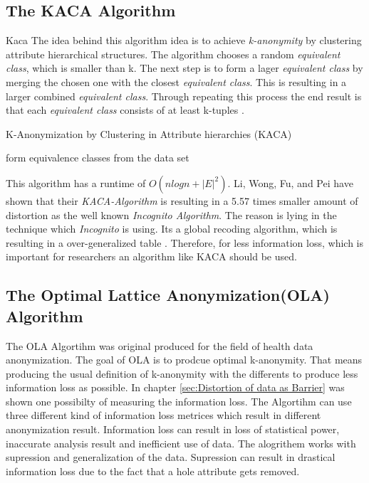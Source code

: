 \documentclass{llncs}
\begin{document}
\subsection{The KACA Algorithm}{Kaca}
The idea behind this algorithm idea is to achieve \textit{k-anonymity} by clustering attribute hierarchical structures. The algorithm chooses a random \textit{equivalent class}, which is smaller than k. The next step is to form a lager \textit{equivalent class} by merging the chosen one with the closest \textit{equivalent class}. This is resulting in a larger combined \textit{equivalent class}. Through repeating this process the end result is that each \textit{equivalent class} consists of at least k-tuples \cite{li2006achieving}.\\
\begin{algorithm}[H]
	\caption{K-Anonymization by Clustering in Attribute hierarchies (KACA) \cite{li2006achieving}}
	form equivalence classes from the data set\\
\end{algorithm}
This algorithm has a runtime of $O(nlogn + |E|^{2})$. Li, Wong, Fu, and Pei have shown that their \textit{KACA-Algorithm} is resulting in a 5.57 times smaller amount of distortion as the well known \textit{Incognito Algorithm}. The reason is lying in the technique which \textit{Incognito} is using. Its a global recoding algorithm, which is resulting in a over-generalized table \cite{li2006achieving}. Therefore, for less information loss, which is important for researchers an algorithm like KACA should be used.


\subsection{The Optimal Lattice Anonymization(OLA) Algorithm}

The OLA Algortihm was original produced for the field of health data anonymization. The goal of OLA is  to prodcue optimal k-anonymity. That means producing the usual definition of k-anonymity with the differents to produce less information loss as possible. In chapter \ref{sec:Distortion of data as Barrier} was shown one possibilty of measuring the information loss. 
The Algortihm can use three different kind of information loss metrices which result in different anonymization result. Information loss can result in loss of statistical power, inaccurate analysis result and inefficient use of data.  The alogrithem works with supression and generalization of the data. Supression can result in drastical information loss due to the fact that a hole attribute gets removed.\\
\end{document}
